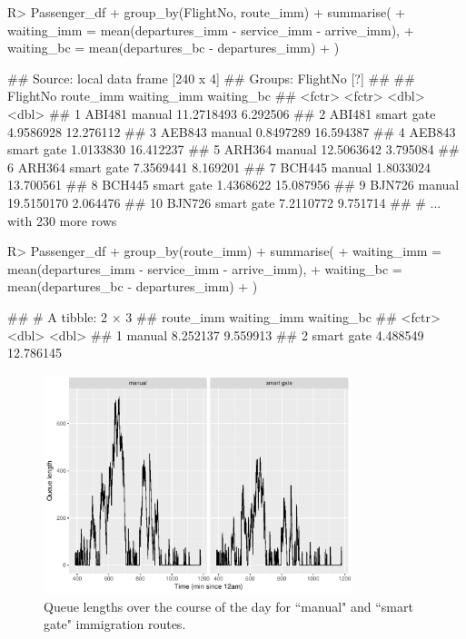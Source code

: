 \documentclass[article]{jss}
\begin{document}
\begin{CodeChunk}
\begin{CodeInput}
R> Passenger_df %
+    group_by(FlightNo, route_imm) %
+    summarise(
+      waiting_imm = mean(departures_imm - service_imm - arrive_imm), 
+      waiting_bc = mean(departures_bc - departures_imm)
+    )
\end{CodeInput}
\begin{CodeOutput}
## Source: local data frame [240 x 4]
## Groups: FlightNo [?]
## 
##    FlightNo  route_imm waiting_imm waiting_bc
##      <fctr>     <fctr>       <dbl>      <dbl>
## 1    ABI481     manual  11.2718493   6.292506
## 2    ABI481 smart gate   4.9586928  12.276112
## 3    AEB843     manual   0.8497289  16.594387
## 4    AEB843 smart gate   1.0133830  16.412237
## 5    ARH364     manual  12.5063642   3.795084
## 6    ARH364 smart gate   7.3569441   8.169201
## 7    BCH445     manual   1.8033024  13.700561
## 8    BCH445 smart gate   1.4368622  15.087956
## 9    BJN726     manual  19.5150170   2.064476
## 10   BJN726 smart gate   7.2110772   9.751714
## # ... with 230 more rows
\end{CodeOutput}
\begin{CodeInput}
R> Passenger_df %
+    group_by(route_imm) %
+    summarise(
+      waiting_imm = mean(departures_imm - service_imm - arrive_imm), 
+      waiting_bc = mean(departures_bc - departures_imm)
+    )
\end{CodeInput}
\begin{CodeOutput}
## # A tibble: 2 × 3
##    route_imm waiting_imm waiting_bc
##       <fctr>       <dbl>      <dbl>
## 1     manual    8.252137   9.559913
## 2 smart gate    4.488549  12.786145
\end{CodeOutput}
\end{CodeChunk}

\begin{figure}[!htb]
\centering
\includegraphics[width = 0.8\textwidth]{figures/queuelength_dplyr.pdf}
\caption{Queue lengths over the course of the day for ``manual" and ``smart gate" immigration routes. }
\label{fig:queuelength_dplyr}
\end{figure}
\end{document}
